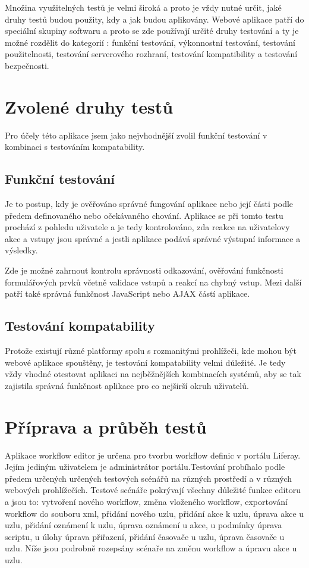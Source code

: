 \documentclass{fithesis}
\begin{document}
Množina využitelných testů je velmi široká a proto je vždy nutné určit, jaké druhy testů budou použity, kdy a jak budou aplikovány. Webové aplikace patří do speciální skupiny softwaru a proto se zde používají určité druhy testování a ty je možné rozdělit do kategorií \cite{web-test}:  funkční testování, výkonnostní testování, testování použitelnosti, testování serverového rozhraní, testování kompatibility a testování bezpečnosti.

\section{Zvolené druhy testů}
Pro účely této aplikace jsem jako nejvhodnější zvolil funkční testování v kombinaci s testováním kompatability.

\subsection{Funkční testování}
Je to postup, kdy je ověřováno správné fungování aplikace nebo její části podle předem definovaného nebo očekávaného chování. Aplikace se při tomto testu prochází z pohledu uživatele a je tedy kontrolováno, zda reakce na uživatelovy akce a vstupy jsou správné a jestli aplikace podává správné výstupní informace a výsledky.

Zde je možné zahrnout kontrolu správnosti odkazování, ověřování funkčnosti formulářových prvků včetně validace vstupů a reakcí na chybný vstup. Mezi další patří také správná funkčnost JavaScript nebo AJAX částí aplikace.

\subsection{Testování kompatability}
Protože existují různé platformy spolu s rozmanitými prohlížeči, kde mohou být webové aplikace spouštěny, je testování kompatability velmi důležité. Je tedy vždy vhodné otestovat aplikaci na nejběžnějších kombinacích systémů, aby se tak zajistila správná funkčnost aplikace pro co nejširší okruh uživatelů.

\section{Příprava a průběh testů}
Aplikace workflow editor je určena pro tvorbu workflow definic v portálu Liferay. Jejím jediným uživatelem je administrátor portálu.Testování probíhalo podle předem určených určených testových scénářů na různých prostředí a v různých webových prohlížečích. Testové scénáře pokrývají všechny důležité funkce editoru a jsou to: vytvoření nového workflow, změna vloženého workflow, exportování workflow do souboru xml, přidání nového uzlu, přidání akce k uzlu, úprava akce u uzlu, přidání oznámení k uzlu, úprava oznámení u akce, u podmínky úprava scriptu, u úlohy úprava přiřazení, přidání časovače u uzlu, úprava časovače u uzlu. Níže jsou podrobně rozepsány scénaře na změnu workflow a úpravu akce u uzlu.
\end{document}
